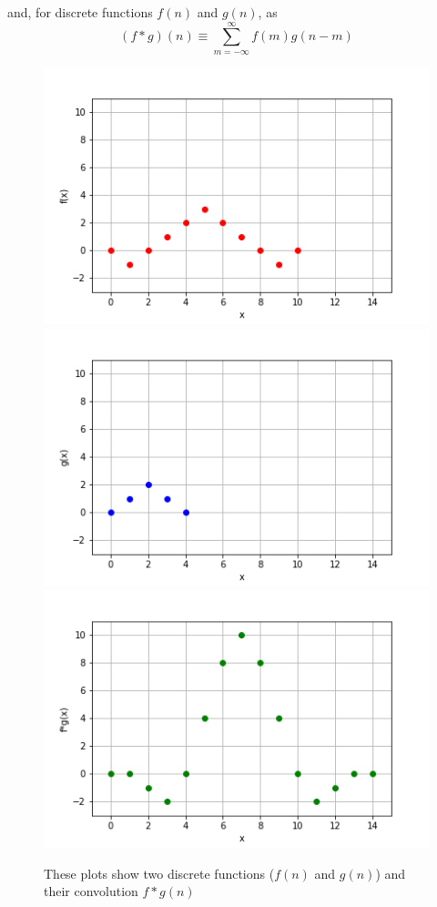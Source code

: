 \FloatBarrier
and, for discrete functions $f(n)$ and $g(n)$, as
\begin{equation}
(f * g)(n)\equiv\sum_{m=-\infty}^{\infty}f(m) g(n-m)
\end{equation}
\begin{figure}[ht]
    \includegraphics[width=.32\linewidth]{graphics/convolution/convolution_discrete_f_gebs.png}
    \includegraphics[width=.32\linewidth]{graphics/convolution/convolution_discrete_g_gebs.png}
    \includegraphics[width=.32\linewidth]{graphics/convolution/convolution_discrete_fg_gebs.png}
    \caption{These plots show two discrete functions ($f(n)$ and $g(n)$) and their convolution $f*g(n)$}
    \label{fig:discreteconvolution}
\end{figure}
\FloatBarrier
